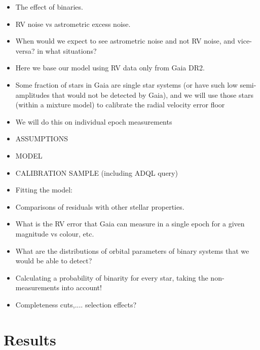 \documentclass[twocolumn]{aastex61}
\begin{document}
\begin{itemize}
\item The effect of binaries.

\item RV noise vs astrometric excess noise.

\item When would we expect to see astrometric noise and not RV noise, and vice-versa? in what situations?

\item Here we base our model using RV data only from Gaia DR2.

\item Some fraction of stars in Gaia are single star systems (or have such low semi-amplitudes that would not be detected by Gaia), and we will use those stars (within a mixture model) to calibrate the radial velocity error floor

\item We will do this on individual epoch measurements

\item ASSUMPTIONS

\item MODEL

\item CALIBRATION SAMPLE (including ADQL query)

\item Fitting the model:

\item Comparisons of residuals with other stellar properties.

\item What is the RV error that Gaia can measure in a single epoch for a given magnitude vs colour, etc. 

\item What are the distributions of orbital parameters of binary systems that we would be able to detect?

\item Calculating a probability of binarity for every star, taking the non-measurements into account!

\item Completeness cuts,.... selection effects?

\end{itemize}

\section{Results}
\end{document}
